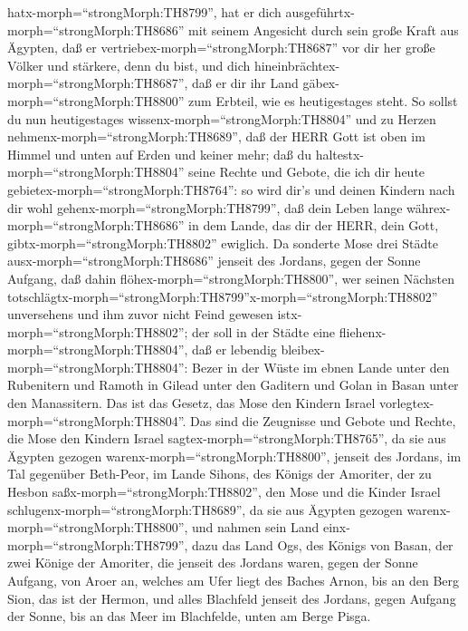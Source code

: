 hatx-morph=``strongMorph:TH8799'', hat er dich
ausgeführtx-morph=``strongMorph:TH8686'' mit seinem Angesicht durch sein
große Kraft aus Ägypten,  daß er
vertriebex-morph=``strongMorph:TH8687'' vor dir her große Völker und
stärkere, denn du bist, und dich
hineinbrächtex-morph=``strongMorph:TH8687'', daß er dir ihr Land
gäbex-morph=``strongMorph:TH8800'' zum Erbteil, wie es heutigestages
steht.  So sollst du nun heutigestages
wissenx-morph=``strongMorph:TH8804'' und zu Herzen
nehmenx-morph=``strongMorph:TH8689'', daß der HERR Gott ist oben im
Himmel und unten auf Erden und keiner mehr;  daß du
haltestx-morph=``strongMorph:TH8804'' seine Rechte und Gebote, die ich
dir heute gebietex-morph=``strongMorph:TH8764'': so wird dir's und
deinen Kindern nach dir wohl gehenx-morph=``strongMorph:TH8799'', daß
dein Leben lange währex-morph=``strongMorph:TH8686'' in dem Lande, das
dir der HERR, dein Gott, gibtx-morph=``strongMorph:TH8802'' ewiglich.
 Da sonderte Mose drei Städte
ausx-morph=``strongMorph:TH8686'' jenseit des Jordans, gegen der Sonne
Aufgang,  daß dahin flöhex-morph=``strongMorph:TH8800'',
wer seinen Nächsten
totschlägtx-morph=``strongMorph:TH8799''x-morph=``strongMorph:TH8802''
unversehens und ihm zuvor nicht Feind gewesen
istx-morph=``strongMorph:TH8802''; der soll in der Städte eine
fliehenx-morph=``strongMorph:TH8804'', daß er lebendig
bleibex-morph=``strongMorph:TH8804'':  Bezer in der Wüste
im ebnen Lande unter den Rubenitern und Ramoth in Gilead unter den
Gaditern und Golan in Basan unter den Manassitern.  Das ist
das Gesetz, das Mose den Kindern Israel
vorlegtex-morph=``strongMorph:TH8804''.  Das sind die
Zeugnisse und Gebote und Rechte, die Mose den Kindern Israel
sagtex-morph=``strongMorph:TH8765'', da sie aus Ägypten gezogen
warenx-morph=``strongMorph:TH8800'',  jenseit des Jordans,
im Tal gegenüber Beth-Peor, im Lande Sihons, des Königs der Amoriter,
der zu Hesbon saßx-morph=``strongMorph:TH8802'', den Mose und die Kinder
Israel schlugenx-morph=``strongMorph:TH8689'', da sie aus Ägypten
gezogen warenx-morph=``strongMorph:TH8800'',  und nahmen
sein Land einx-morph=``strongMorph:TH8799'', dazu das Land Ogs, des
Königs von Basan, der zwei Könige der Amoriter, die jenseit des Jordans
waren, gegen der Sonne Aufgang,  von Aroer an, welches am
Ufer liegt des Baches Arnon, bis an den Berg Sion, das ist der Hermon,
 und alles Blachfeld jenseit des Jordans, gegen Aufgang der
Sonne, bis an das Meer im Blachfelde, unten am Berge Pisga.

